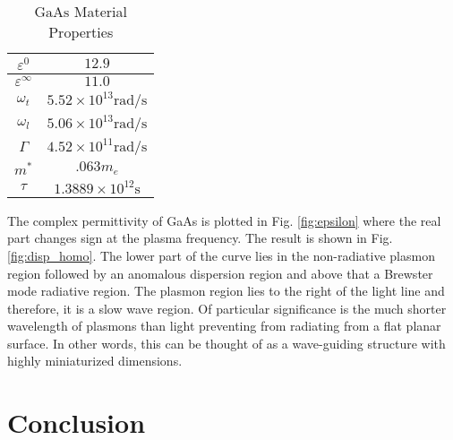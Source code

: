 \documentclass[conference, 10pt]{IEEEtran}
\renewcommand{\O}{\omega}  %
\newcommand{\E}{\varepsilon}  %
\renewcommand{\inf}{\infty}  %
\renewcommand{\^}{\hat}  %
\begin{document}
%
%
\begin{table}[h]
\renewcommand{\arraystretch}{1.3}
\caption{$\mathrm{GaAs}$ Material Properties}
\label{table_example}
\centering
\begin{tabular}{c||c}
\hline
$\E^{0}$ & $12.9$\\ \hline
$\E^{\inf}$ & $11.0$ \\  \hline
$\O_t$ & $5.52 \times 10^{13} \mathrm{rad/s}$ \\  \hline
$\O_l$ & $5.06 \times 10^{13} \mathrm{rad/s}$ \\  \hline
$\Gamma$ &  $4.52 \times 10^{11} \mathrm{rad/s}$ \\  \hline
$m^{\ast}$ & $.063 m_e$ \\  \hline
$\tau$ & $1.3889 \times 10^{12} \mathrm{s} $ \\  \hline
\end{tabular}
\label{tab:data}
\end{table}
%
The complex permittivity of GaAs is plotted in Fig. \ref{fig:epsilon} where the real part changes sign at the plasma frequency. The result is shown in Fig. \ref{fig:disp_homo}. The lower part of the curve lies in the non-radiative plasmon region followed by an anomalous dispersion region and above that a Brewster mode radiative region. The plasmon region lies to the right of the light line and therefore, it is a slow wave region. Of particular significance is the much shorter wavelength of plasmons than light preventing from radiating from a flat planar surface. In other words, this can be thought of as a wave-guiding structure with highly miniaturized dimensions.
%
%   
%   
%

%   

\section{Conclusion}
%

%


\end{document}

